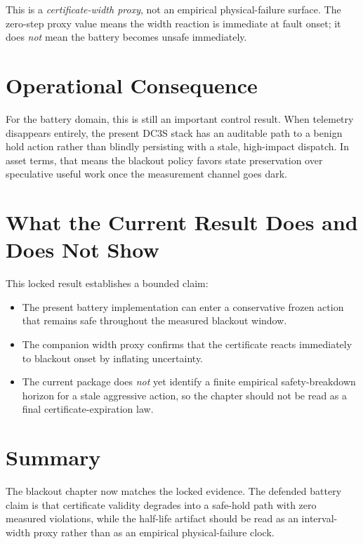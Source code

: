 This is a \emph{certificate-width proxy}, not an empirical physical-failure
surface.  The zero-step proxy value means the width reaction is immediate at
fault onset; it does \emph{not} mean the battery becomes unsafe immediately.

\section{Operational Consequence}

For the battery domain, this is still an important control result.  When
telemetry disappears entirely, the present DC3S stack has an auditable path
to a benign hold action rather than blindly persisting with a stale,
high-impact dispatch.  In asset terms, that means the blackout policy favors
state preservation over speculative useful work once the measurement channel
goes dark.

\section{What the Current Result Does and Does Not Show}

This locked result establishes a bounded claim:

\begin{itemize}
  \item The present battery implementation can enter a conservative frozen
    action that remains safe throughout the measured blackout window.
  \item The companion width proxy confirms that the certificate reacts
    immediately to blackout onset by inflating uncertainty.
  \item The current package does \emph{not} yet identify a finite empirical
    safety-breakdown horizon for a stale aggressive action, so the chapter
    should not be read as a final certificate-expiration law.
\end{itemize}

\section{Summary}

The blackout chapter now matches the locked evidence.  The defended battery
claim is that certificate validity degrades into a safe-hold path
with zero measured violations, while the half-life artifact should be read as
an interval-width proxy rather than as an empirical physical-failure clock.
